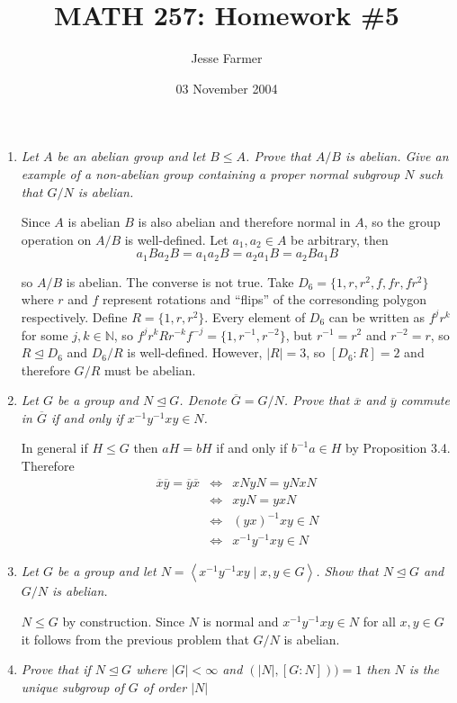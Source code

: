 \documentclass[letterpaper, 11pt]{article}
\title{MATH 257: Homework \#5}
\author{Jesse Farmer}
\date{03 November 2004}
\newcommand{\brac}[1]{
\left\langle #1 \right\rangle
}
\begin{document}
\maketitle
\begin{enumerate}

\item \emph{Let $A$ be an abelian group and let $B \leq A$.  Prove that $A/B$ is abelian.  Give an example of a non-abelian group containing a proper normal subgroup $N$ such that $G/N$ is abelian.}

Since $A$ is abelian $B$ is also abelian and therefore normal in $A$, so the group operation on $A/B$ is well-defined.  Let $a_1, a_2 \in A$ be arbitrary, then
\[
a_1Ba_2B = a_1a_2B = a_2a_1B = a_2Ba_1B
\]

so $A/B$ is abelian.  The converse is not true.  Take $D_6 = \{1,r,r^2, f,fr,fr^2\}$ where $r$ and $f$ represent rotations and ``flips'' of the corresonding polygon respectively.  Define $R = \{1,r,r^2\}$.  Every element of $D_6$ can be written as $f^jr^k$ for some $j,k \in \mathbb{N}$, so $f^jr^kRr^{-k}f^{-j} = \{1, r^{-1}, r^{-2}\}$, but $r^{-1} = r^2$ and $r^{-2} = r$, so $R \unlhd D_6$ and $D_6/R$ is well-defined.  However, $|R|=3$, so $[D_6:R] = 2$ and therefore $G/R$ must be abelian.

\item \emph{Let $G$ be a group and $N \unlhd G$.  Denote $\overline{G} = G/N$.  Prove that $\overline{x}$ and $\overline{y}$ commute in $\overline{G}$ if and only if $x^{-1}y^{-1}xy \in N$.}

In general if $H \leq G$ then $aH = bH$ if and only if $b^{-1}a \in H$ by Proposition 3.4.  Therefore
\begin{eqnarray*}
\overline{x}\overline{y} = \overline{y}\overline{x} &\Leftrightarrow& xNyN = yNxN \\
&\Leftrightarrow& xyN = yxN \\
&\Leftrightarrow& (yx)^{-1}xy \in N \\
&\Leftrightarrow& x^{-1}y^{-1}xy \in N
\end{eqnarray*}

\item \emph{Let $G$ be a group and let $N = \brac{x^{-1}y^{-1}xy \mid x,y \in G}$.  Show that $N \unlhd G$ and $G/N$ is abelian.}

$N \leq G$ by construction.  Since $N$ is normal and $x^{-1}y^{-1}xy \in N$ for all $x,y \in G$ it follows from the previous problem that $G/N$ is abelian.

\item \emph{Prove that if $N \unlhd G$ where $|G| < \infty$ and $(|N|, [G:N]))=1$ then $N$ is the unique subgroup of $G$ of order $|N|$}


\end{enumerate}
\end{document}
